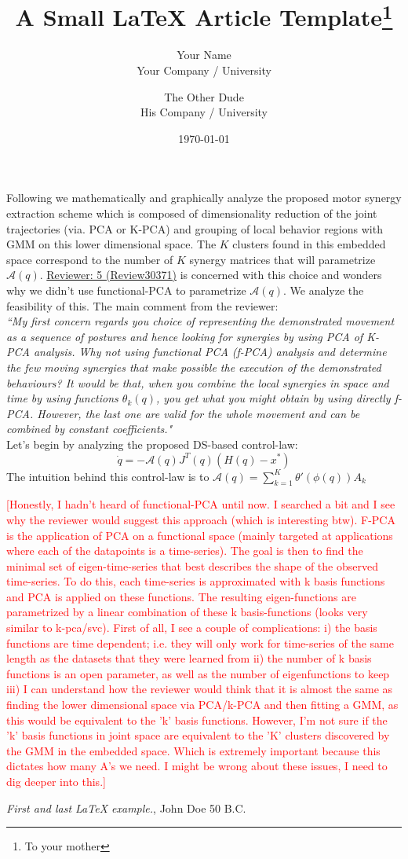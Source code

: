 \documentclass{article}
\title{A Small \LaTeX{} Article Template\thanks{To your mother}}
\author{Your Name  \\
	Your Company / University  \\
	\and 
	The Other Dude \\
	His Company / University \\
	}
\date{\today}
\begin{document}
\vspace{-10pt}
Following we mathematically and graphically analyze the proposed motor synergy extraction scheme which is composed of dimensionality reduction of the joint trajectories (via. PCA or K-PCA) and grouping of local behavior regions with GMM on this lower dimensional space. The $K$ clusters found in this embedded space correspond to the number of $K$ synergy matrices that will parametrize $\mathcal{A}(q)$. \underline{Reviewer: 5 (Review30371)} is concerned with this choice and wonders why we didn't use functional-PCA to parametrize $\mathcal{A}(q)$. We analyze the feasibility of this. The main comment from the reviewer:\\

\textit{``My first concern regards you choice of representing the demonstrated
movement as a sequence of postures and hence looking for synergies by
using PCA of K-PCA analysis. Why not using functional PCA (f-PCA)
analysis and determine the few moving synergies that make possible the
execution of the demonstrated behaviours? It would be that, when you
combine the local synergies in space and time by using functions
$\theta_k(q)$, you get what you might obtain by using directly f-PCA.
However, the last one are valid for the whole movement and can be
combined by constant coefficients."} \\

Let's begin by analyzing the proposed DS-based control-law:
\begin{equation}
\dot{q} = -\mathcal{A}(q)J^{T}(q)(H(q)-x^*)
\end{equation}
The intuition behind this control-law is to
$\mathcal{A}(q) = \sum\limits_{k=1}^{K}\theta'(\phi(q))A_k$


\textcolor{red}{[Honestly, I hadn't heard of functional-PCA until now. I searched a bit and I see why the reviewer would suggest this approach (which is interesting btw). F-PCA is the application of PCA on a functional space (mainly targeted at applications where each of the datapoints is a time-series). The goal is then to find the minimal set of eigen-time-series that best describes the shape of the observed time-series.
To do this, each time-series is approximated with k basis functions and PCA is applied on these functions. The resulting eigen-functions are parametrized by a linear combination of these k basis-functions (looks very similar to k-pca/svc). First of all, I see a couple of complications: i) the basis functions are time dependent; i.e. they will only work for time-series of the same length as the datasets that they were learned from ii) the number of k basis functions is an open parameter, as well as the number of eigenfunctions to keep iii) I can understand how the reviewer would think that it is almost the same as finding the lower dimensional space via PCA/k-PCA and then fitting a GMM, as this would be equivalent to the 'k' basis functions. However, I'm not sure if the 'k' basis functions in joint space are equivalent to the 'K' clusters discovered by the GMM in the embedded space. Which is extremely important because this dictates how many A's we need. I might be wrong about these issues, I need to dig deeper into this.]}


\begin{thebibliography}{9}
 \emph{First and last \LaTeX{} example.},
John Doe 50 B.C. 
\end{thebibliography}
\end{document}
